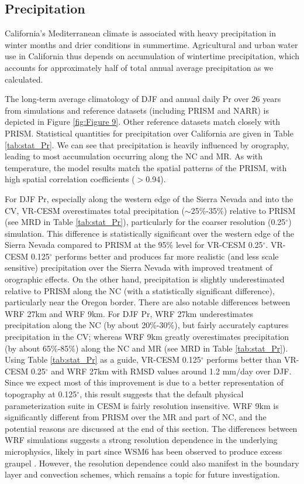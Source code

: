 \documentclass[ms,draft]{agutex}   %
\begin{document}
\begin{article}
\subsection{Precipitation}

California's Mediterranean climate is associated with heavy precipitation in winter months and drier conditions in summertime.  Agricultural and urban water use in California thus depends on accumulation of wintertime precipitation, which accounts for approximately half of total annual average precipitation as we calculated.

The long-term average climatology of DJF and annual daily Pr over 26 years from simulations and reference datasets (including PRISM and NARR) is depicted in Figure \ref{fig:Figure 9}. Other reference datasets match closely with PRISM. Statistical quantities for precipitation over California are given in Table \ref{tab:stat_Pr}. We can see that precipitation is heavily influenced by orography, leading to most accumulation occurring along the NC and MR. As with temperature, the model results match the spatial patterns of the PRISM, with high spatial correlation coefficients ($>$0.94).

For DJF Pr, especially along the western edge of the Sierra Nevada and into the CV, VR-CESM overestimates total precipitation ($\sim$25$\%$-35$\%$) relative to PRISM (see MRD in Table \ref{tab:stat_Pr}), particularly for the coarser resolution (0.25$^\circ$) simulation. This difference is statistically significant over the western edge of the Sierra Nevada compared to PRISM at the 95\% level for VR-CESM 0.25$^\circ$. VR-CESM 0.125$^\circ$ performs better and produces far more realistic (and less scale sensitive) precipitation over the Sierra Nevada with improved treatment of orographic effects. On the other hand, precipitation is slightly underestimated relative to PRISM along the NC (with a statistically significant difference), particularly near the Oregon border. There are also notable differences between WRF 27km and WRF 9km. For DJF Pr, WRF 27km underestimates precipitation along the NC (by about 20$\%$-30$\%$), but fairly accurately captures precipitation in the CV; whereas WRF 9km greatly overestimates precipitation (by about 65$\%$-85$\%$) along the NC and MR (see MRD in Table \ref{tab:stat_Pr}). Using Table \ref{tab:stat_Pr} as a guide, VR-CESM 0.125$^\circ$ performs  better than VR-CESM 0.25$^\circ$ and WRF 27km with RMSD values around 1.2 mm$/$day over DJF. Since we expect most of this improvement is due to a better representation of topography at 0.125$^\circ$, this result suggests that the default physical parameterization suite in CESM is fairly resolution insensitive. WRF 9km is significantly different from PRISM over the MR and part of NC, and the potential reasons are discussed at the end of this section. The differences between WRF simulations suggests a strong resolution dependence in the underlying microphysics, likely in part since WSM6 has been observed to produce excess graupel \citep{jankov2009evaluation}. However, the resolution dependence could also manifest in the boundary layer and convection schemes, which remains a topic for future investigation.


\end{article}
\end{document}
